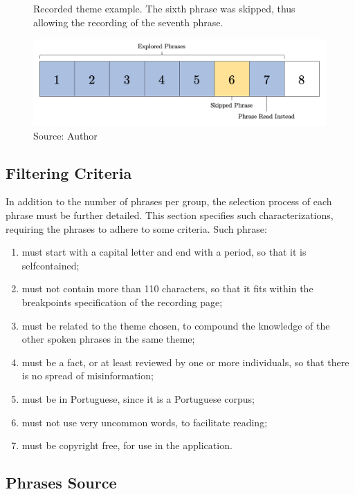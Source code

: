 \begin{figure}[h]
    \centering
    \caption{Recorded theme example. The sixth phrase was skipped, thus allowing the recording of the seventh phrase.}
    \includegraphics[width=\linewidth]{images/phrase-selection/phrase-skip.png}
    \caption*{Source: Author}
    \label{fig:falealgumacoisa-phrase-skip}
\end{figure}

\subsection{Filtering Criteria}

In addition to the number of phrases per group, the selection process of each phrase must be further detailed. This section specifies such characterizations, requiring the phrases to adhere to some criteria. Such phrase:

\begin{enumerate}
    \item must start with a capital letter and end with a period, so that it is selfcontained;
    \item must not contain more than 110 characters, so that it fits within the breakpoints specification of the recording page;
    \item must be related to the theme chosen, to compound the knowledge of the other spoken phrases in the same theme;
    \item must be a fact, or at least reviewed by one or more individuals, so that there is no spread of misinformation;
    \item must be in Portuguese, since it is a Portuguese corpus;
    \item must not use very uncommon words, to facilitate reading;
    \item must be copyright free, for use in the application.
\end{enumerate}

\subsection{Phrases Source}

